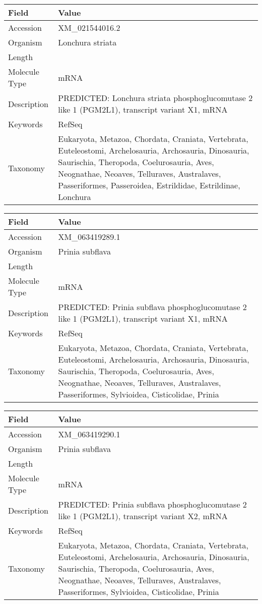 \documentclass[10pt]{article}
\begin{document}
{\footnotesize
\begin{longtable}{>{\raggedright\arraybackslash}p{4.5cm} >{\raggedright\arraybackslash}p{11.5cm}}
\textbf{Field} & \textbf{Value} \\
\hline
Accession & XM\_021544016.2 \\
Organism & Lonchura striata \\
Length & 6016 \\
Molecule Type & mRNA \\
Description & PREDICTED: Lonchura striata phosphoglucomutase 2 like 1 (PGM2L1), transcript variant X1, mRNA \\
Keywords & RefSeq \\
Taxonomy & Eukaryota, Metazoa, Chordata, Craniata, Vertebrata, Euteleostomi, Archelosauria, Archosauria, Dinosauria, Saurischia, Theropoda, Coelurosauria, Aves, Neognathae, Neoaves, Telluraves, Australaves, Passeriformes, Passeroidea, Estrildidae, Estrildinae, Lonchura \\
\end{longtable}
}

{\footnotesize
\begin{longtable}{>{\raggedright\arraybackslash}p{4.5cm} >{\raggedright\arraybackslash}p{11.5cm}}
\textbf{Field} & \textbf{Value} \\
\hline
Accession & XM\_063419289.1 \\
Organism & Prinia subflava \\
Length & 6038 \\
Molecule Type & mRNA \\
Description & PREDICTED: Prinia subflava phosphoglucomutase 2 like 1 (PGM2L1), transcript variant X1, mRNA \\
Keywords & RefSeq \\
Taxonomy & Eukaryota, Metazoa, Chordata, Craniata, Vertebrata, Euteleostomi, Archelosauria, Archosauria, Dinosauria, Saurischia, Theropoda, Coelurosauria, Aves, Neognathae, Neoaves, Telluraves, Australaves, Passeriformes, Sylvioidea, Cisticolidae, Prinia \\
\end{longtable}
}

{\footnotesize
\begin{longtable}{>{\raggedright\arraybackslash}p{4.5cm} >{\raggedright\arraybackslash}p{11.5cm}}
\textbf{Field} & \textbf{Value} \\
\hline
Accession & XM\_063419290.1 \\
Organism & Prinia subflava \\
Length & 5840 \\
Molecule Type & mRNA \\
Description & PREDICTED: Prinia subflava phosphoglucomutase 2 like 1 (PGM2L1), transcript variant X2, mRNA \\
Keywords & RefSeq \\
Taxonomy & Eukaryota, Metazoa, Chordata, Craniata, Vertebrata, Euteleostomi, Archelosauria, Archosauria, Dinosauria, Saurischia, Theropoda, Coelurosauria, Aves, Neognathae, Neoaves, Telluraves, Australaves, Passeriformes, Sylvioidea, Cisticolidae, Prinia \\
\end{longtable}
}
\end{document}
